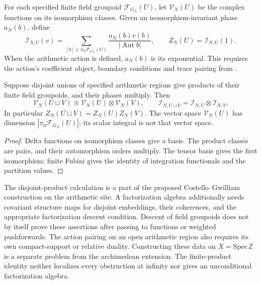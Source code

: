 \begin{definition}
\label{v4-arith:w10-a:def:CG-Kim-prefactor}
For each specified finite field groupoid $\mathcal F_{G_N}(U)$, let
$\mathcal V_N(U)$ be the complex functions on its isomorphism classes.
Given an isomorphism-invariant phase $a_N(b)$, define
\[
 \mathcal I_{N,U}(v)=\sum_{[b]\in\pi_0\mathcal F_{G_N}(U)}
       \frac{a_N(b)v(b)}{|\operatorname{Aut}b|},\qquad
 Z_N(U)=\mathcal I_{N,U}(1).
\]
When the arithmetic action is defined, $a_N(b)$ is its exponential.
This requires the action's coefficient object, boundary conditions
and trace pairing from .
\end{definition}

\begin{proposition}
\label{v4-arith:w10-a:thm:CG-open}
Suppose disjoint unions of specified arithmetic regions give products
of their finite field groupoids, and their phases multiply.
Then
\[
 \mathcal V_N(U\sqcup V)\cong\mathcal V_N(U)\otimes\mathcal V_N(V),
 \qquad \mathcal I_{N,U\sqcup V}=\mathcal I_{N,U}\otimes\mathcal I_{N,V}.
\]
In particular $Z_N(U\sqcup V)=Z_N(U)Z_N(V)$.
The vector space $\mathcal V_N(U)$ has dimension
$|\pi_0\mathcal F_{G_N}(U)|$; its scalar integral is not that vector space.
\end{proposition}
\begin{proof}
Delta functions on isomorphism classes give a basis. The product
classes are pairs, and their automorphism orders multiply.
The tensor basis gives the first isomorphism; finite Fubini gives
the identity of integration functionals and the partition values.
\end{proof}

\begin{remark}
\label{v4-arith:w10-a:rem:construction-III-uncond}
The disjoint-product calculation is a part of the proposed
Costello--Gwilliam construction on the arithmetic site.
A factorization algebra additionally needs covariant structure maps
for disjoint embeddings, their coherences, and the appropriate
factorization descent condition. Descent of field groupoids does
not by itself prove these assertions after passing to functions
or weighted pushforwards. The action pairing on an open arithmetic
region also requires its own compact-support or relative duality.
Constructing these data on $X=\mathrm{Spec}\,\mathbb Z$ is a
separate problem from the archimedean extension. The finite-product
identity neither localizes every obstruction at infinity nor gives
an unconditional factorization algebra.
\end{remark}

